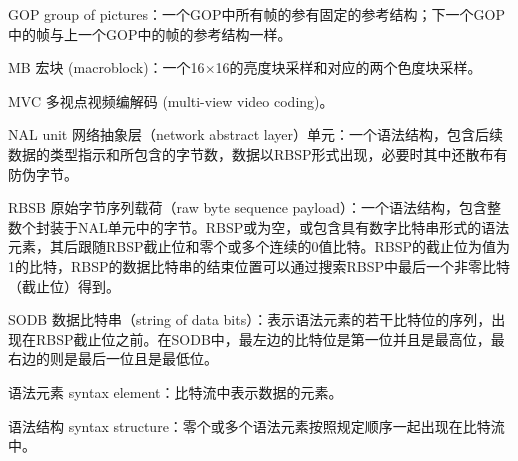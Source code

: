 \begin{denotation}
\item[GOP]	group of pictures：一个GOP中所有帧的参有固定的参考结构；下一个GOP中的帧与上一个GOP中的帧的参考结构一样。

\item[MB]	宏块 (macroblock)：一个16$\times$16的亮度块采样和对应的两个色度块采样。

\item[MVC]	多视点视频编解码 (multi-view video coding)。

\item[NAL unit] 网络抽象层（network abstract layer）单元：一个语法结构，包含后续数据的类型指示和所包含的字节数，数据以RBSP形式出现，必要时其中还散布有防伪字节。

\item[RBSB] 原始字节序列载荷（raw byte sequence payload）：一个语法结构，包含整数个封装于NAL单元中的字节。RBSP或为空，或包含具有数字比特串形式的语法元素，其后跟随RBSP截止位和零个或多个连续的0值比特。RBSP的截止位为值为1的比特，RBSP的数据比特串的结束位置可以通过搜索RBSP中最后一个非零比特（截止位）得到。

\item[SODB] 数据比特串（string of data bits）：表示语法元素的若干比特位的序列，出现在RBSP截止位之前。在SODB中，最左边的比特位是第一位并且是最高位，最右边的则是最后一位且是最低位。

\item[语法元素] syntax element：比特流中表示数据的元素。

\item[语法结构] syntax structure：零个或多个语法元素按照规定顺序一起出现在比特流中。

\end{denotation}
